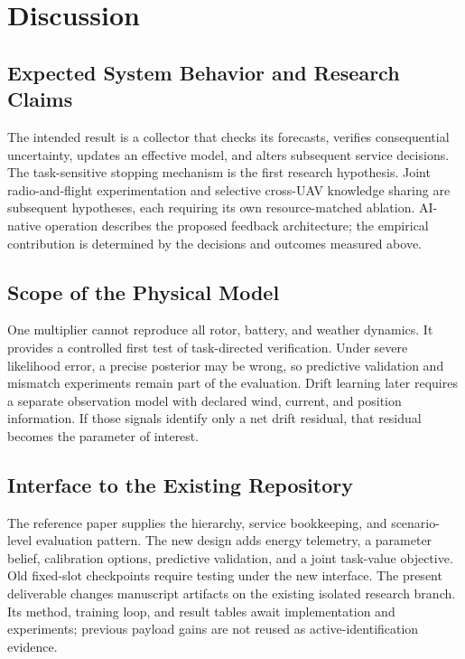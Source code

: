 \documentclass[10pt,twocolumn,letterpaper]{article}
\begin{document}
\section{Discussion}
\subsection{Expected System Behavior and Research Claims}
The intended result is a collector that checks its forecasts, verifies consequential uncertainty, updates an effective model, and alters subsequent service decisions. The task-sensitive stopping mechanism is the first research hypothesis. Joint radio-and-flight experimentation and selective cross-UAV knowledge sharing are subsequent hypotheses, each requiring its own resource-matched ablation. AI-native operation describes the proposed feedback architecture; the empirical contribution is determined by the decisions and outcomes measured above.

\subsection{Scope of the Physical Model}
One multiplier cannot reproduce all rotor, battery, and weather dynamics. It provides a controlled first test of task-directed verification. Under severe likelihood error, a precise posterior may be wrong, so predictive validation and mismatch experiments remain part of the evaluation. Drift learning later requires a separate observation model with declared wind, current, and position information. If those signals identify only a net drift residual, that residual becomes the parameter of interest.

\subsection{Interface to the Existing Repository}
The reference paper supplies the hierarchy, service bookkeeping, and scenario-level evaluation pattern. The new design adds energy telemetry, a parameter belief, calibration options, predictive validation, and a joint task-value objective. Old fixed-slot checkpoints require testing under the new interface. The present deliverable changes manuscript artifacts on the existing isolated research branch. Its method, training loop, and result tables await implementation and experiments; previous payload gains are not reused as active-identification evidence.
\end{document}
